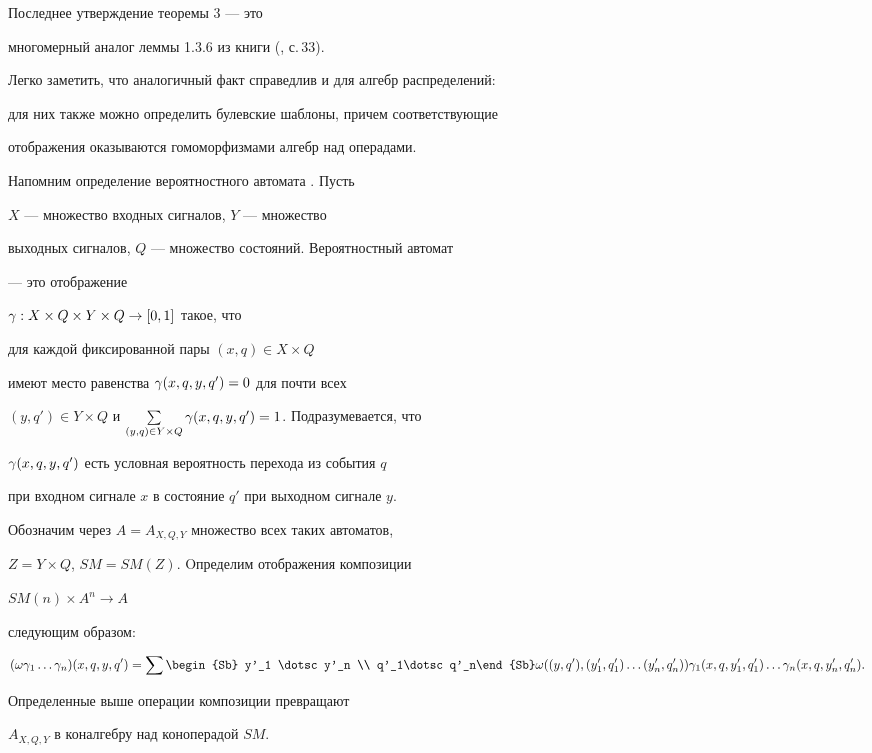 Последнее утверждение теоремы 3 --- это


многомерный аналог леммы 1.3.6 из книги (\cite{Buh}, с.\,33).


Легко заметить, что аналогичный факт справедлив и для алгебр распределений:


для них также можно определить булевские шаблоны, причем соответствующие


отображения оказываются гомоморфизмами алгебр над операдами.


Напомним определение вероятностного автомата \cite{Buh}. Пусть


$X$ --- множество входных сигналов, $Y$ --- множество


выходных сигналов, $Q$ --- множество состояний. Вероятностный автомат


--- это отображение


$\gamma : X\times Q\times Y\times Q \to [0,1]$ такое, что


для каждой фиксированной пары $(x,q)\in X\times Q$


имеют место равенства $\gamma(x,q,y,q')=0$ для почти всех


$(y,q')\in Y\times Q$ и $\sum\limits_{(y,q) \in Y\times Q}


\g(x,q,y,q')=1$. Подразумевается, что


$\gamma(x,q,y,q')$ есть условная вероятность перехода из события $q$


при входном сигнале $x$ в состояние $q'$ при выходном сигнале $y$.


Обозначим через $A=A_{X,Q,Y}$ множество всех таких автоматов,


$Z=Y\times Q$, $SM=SM(Z)$. Oпределим отображения композиции


$SM(n)\times A^n\to A$


следующим образом:


$$


(\o \g_1 \dotsc \g_n)(x,q,y,q')=


\sum \begin{Sb} y'_1 \dotsc y'_n \\  q'_1\dotsc q'_n\end{Sb}


\o((y,q'),(y'_1,q'_1)\dotsc (y'_n,q'_n))\g_1(x,q,y'_1,q'_1)\dotsc


\g_n(x,q,y'_n,q'_n).


$$





\begin{thm}


Определенные выше операции композиции превращают


$A_{X,Q,Y}$ в коналгебру над коноперадой $SM$.


\end{thm}





